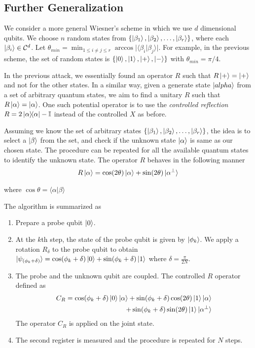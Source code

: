 \documentclass[]{article}
\newcommand*{\I}{\mathbb I}
\newcommand{\iprodq}[2]{\langle #1 \vert #2 \rangle}
\begin{document}
\subsection{Further Generalization}
We consider a more general Wiesner's scheme in which we use $d$ dimensional qubits. We choose $n$ random states from $\{ \ket{\beta_1}, \ket{\beta_2}, \dots, \ket{\beta_r}\}$, where each $\ket{\beta_i} \in \mathcal C^d$.  Let $\theta_{min} = \min_{ 1 \leq i \neq j \leq r} \arccos \vert \langle \beta_i\vert \beta_j \rangle \vert$. For example, in the previous scheme, the set of random states is $\{\ket{0}, \ket{1}, \ket{+}, \ket{-}\}$ with $\theta_{min} = \pi/4$.

In the previous attack, we essentially found an operator $R$ such that $R \ket{+} = \ket{+}$ and not for the other states. In a similar way, given a generate state $\ket{alpha}$ from a set of arbitrary quantum states, we aim to find a unitary $R$ such that $R \ket{\alpha} = \ket{\alpha}$. One such potential operator is to use the \textit{controlled reflection} $R = 2 \ketbra{\alpha}{\alpha} - \I$ instead of the controlled $X$ as before.

Assuming we know the set of arbitrary states $\{\ket{\beta_1}, \ket{\beta_2}, \dots, \ket{\beta_r}\}$, the idea is to select a $\ket{\beta}$ from the set, and check if the unknown state $\ket{\alpha}$ is same as our chosen state. The procedure can be repeated for all the available quantum states to identify the unknown state. The operator $R$ behaves in the following manner
\begin{align}
    R \ket{\alpha} = \cos (2\theta) \ket{\alpha} + \sin(2\theta) \ket{\alpha^\perp}
\end{align}

where $\cos \theta = \iprodq{\alpha}{\beta}$

The algorithm is summarized as 
\begin{enumerate}
    \item Prepare a probe qubit $\ket{0}$.
    \item At the $k$th step, the state of the probe qubit is given by $\ket{\phi_k}$. We apply a rotation $R_\delta$ to the probe qubit to obtain $\ket{\psi_{(\phi_k + \delta)}} = \cos(\phi_k + \delta) \ket{0} + \sin (\phi_k + \delta) \ket{1}$ where $\delta = \frac{\pi}{2N}$.
    \item The probe and the unknown qubit are coupled. The controlled $R$ operator defined as 
    \begin{align}
        C_R = \cos (\phi_k + \delta) \ket{0}\ket{\alpha} + \sin (\phi_k + \delta) \cos (2\theta) \ket{1} \ket{\alpha} \\
        + \sin(\phi_k + \delta) \sin (2\theta) \ket{1} \ket{\alpha^\perp}
    \end{align}
    The operator $C_R$ is applied on the joint state.
    \item The second register is measured and the procedure is repeated for $N$ steps.
\end{enumerate}
\end{document}

